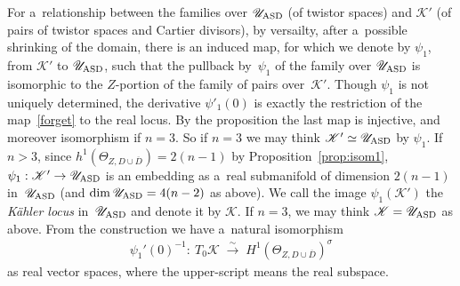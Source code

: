 \documentclass[11pt]{article}
\numberwithin{equation}{section}
\begin{document}
For a~relationship between the families over $\mathscr U_{\rm{ASD}}$ (of twistor spaces) and $\mathscr K'$ (of pairs of
twistor spaces and Cartier divisors), by versailty, after a~possible shrinking of the domain, there is an induced map,
for which we denote by $\psi_1$, from $\mathscr K'$ to $\mathscr U_{\rm{ASD}}$, such that the pullback by~$\psi_1$ of
the family over $\mathscr U_{\rm{ASD}}$ is isomorphic to the $Z$-portion of the family of pairs over~$\mathscr K'$.
Though $\psi_1$ is not uniquely determined, the derivative $\psi'_1(0)$ is exactly the restriction of the
map~\eqref{forget} to the real locus.
By the proposition the last map is injective, and moreover isomorphism if $n=3$.
So if $n=3$ we may think $\mathscr K' \simeq \mathscr U_{\rm{ASD}}$ by $\psi_1$.
If $n>3$, since $h^1(\Theta_{Z,D\cup\overline D}) = 2(n-1)$ by Proposition~\ref{prop:isom1}, $\psi_1:\mathscr
K'\to\mathscr U_{\rm{ASD}}$ is an embedding as a~real submanifold of dimension $2(n-1)$ in~$\mathscr U_{\rm{ASD}}$ (and
$\dim \mathscr U_{\rm{ASD}} = 4(n-2)$ as above).
We call the image $\psi_1(\mathscr K')$ the {\em K\"ahler locus} in~$\mathscr U_{\rm ASD}$ and denote it by $\mathscr
K$.
If $n=3$, we may think $\mathscr K = \mathscr U_{\rm{ASD}}$ as above.
From the construction we have a~natural isomorphism
\begin{gather*}
\psi_1'(0)^{-1}: \ T_0\mathscr K
\;\stackrel{\sim}{\longrightarrow}
\;
H^1(\Theta_{Z,D\cup\overline D})^{\sigma}
\end{gather*}
as real vector spaces, where the upper-script means the real subspace.
\end{document}
